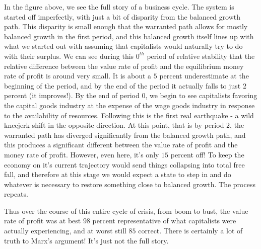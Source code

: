 \documentclass{article}
\theoremstyle{theorem}
\begin{document}
In the figure above, we see the full story of a business cycle. The system is started off imperfectly, with just a bit of disparity from the balanced growth path. This disparity is small enough that the warranted path allows for mostly balanced growth in the first period, and this balanced growth itself lines up with what we started out with assuming that capitalists would naturally try to do with their surplus. We can see during this $0^{th}$ period of relative stability that the relative difference between the value rate of profit and the equilibrium money rate of profit is around very small. It is about a $5$ percent underestimate at the beginning of the period, and by the end of the period it actually falls to just $2$ percent (it improves!). By the end of period $0$, we begin to see capitalists favoring the capital goods industry at the expense of the wage goods industry in response to the availability of resources. Following this is the first real earthquake - a wild kneejerk shift in the opposite direction. At this point, that is by period $2$, the warranted path has diverged significantly from the balanced growth path, and this produces a significant different between the value rate of profit and the money rate of profit. However, even here, it's only $15$ percent off! To keep the economy on it's current trajectory would send things collapsing into total free fall, and therefore at this stage we would expect a state to step in and do whatever is necessary to restore something close to balanced growth. The process repeats. \par 
Thus over the course of this entire cycle of crisis, from boom to bust, the value rate of profit was at best $98$ percent representative of what capitalists were actually experiencing, and at worst still $85$ correct. There is certainly a lot of truth to Marx's argument! It's just not the full story. 
\end{document}
